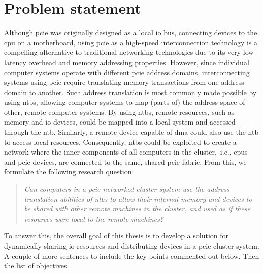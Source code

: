 \section{Problem statement}\label{sec:objectives}
Although \gls{pcie} was originally designed as a local \gls{io} bus, connecting devices to the \gls{cpu} on a motherboard, using \gls{pcie} as a high-speed interconnection technology is a compelling alternative to traditional networking technologies due to its very low latency overhead and memory addressing properties.
%
However, since individual computer systems operate with different \gls{pcie} address domains, interconnecting systems using \gls{pcie} require translating memory transactions from one address domain to another. 
%
Such address translation is most commonly made possible by using \glspl{ntb}, allowing computer systems to map (parts of) the address space of other, remote computer systems. 
%
By using \glspl{ntb}, remote resources, such as memory and \gls{io} devices, could be mapped into a local system and accessed through the \gls{ntb}. 
%
Similarly, a remote device capable of \gls{dma} could also use the \gls{ntb} to access local resources. 
%
Consequently, \glspl{ntb} could be exploited to create a network where the inner components of all computers in the cluster,~i.e., \glspl{cpu} and \gls{pcie} devices, are connected to the same, shared \gls{pcie} fabric.
%
From this, we formulate the following research question:
\begin{quote}\itshape
    Can computers in a \gls{pcie}-networked cluster system use the address translation abilities of \glspl{ntb} to allow their internal memory and devices to be shared with other remote machines in the cluster, and used as if these resources were local to the remote machines?
\end{quote}

To answer this, the overall goal of this thesis is to develop a solution for dynamically sharing \gls{io} resources and distributing devices in a \gls{pcie} cluster system. A couple of more sentences to include the key points commented out below. Then the list of objectives.
%
%

